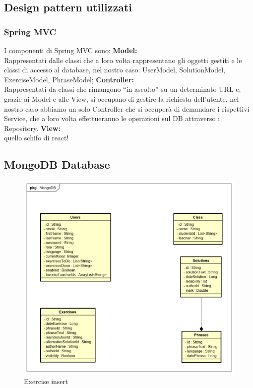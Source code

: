\subsection{Design pattern utilizzati}
\subsubsection{Spring MVC}
I componenti di Spring MVC sono:
\textbf{Model:}\\
Rappresentati dalle classi che a loro volta rappresentano gli oggetti gestiti e le classi di accesso al database, nel nostro caso:
UserModel, SolutionModel, ExerciseModel, PhraseModel;
\textbf{Controller:}\\
Rappresentati da classi che rimangono “in ascolto” su un determinato URL e, grazie ai Model e alle View, si occupano di gestire la richiesta dell’utente, nel nostro caso abbiamo un solo Controller che si occuperà di demandare i rispettivi Service, che a loro volta effettueranno le operazioni sul DB attraverso i Repository.
\textbf{View:}\\ quello schifo di react!

\subsection{MongoDB Database}
\begin{figure}[H]
\centering
\includegraphics[width=17cm, keepaspectratio]{img/mongodb.png} 
\caption{Exercise insert}
\end{figure}